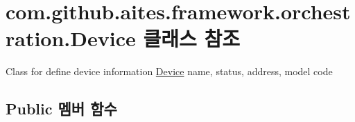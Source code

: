 \hypertarget{classcom_1_1github_1_1aites_1_1framework_1_1orchestration_1_1_device}{}\section{com.\+github.\+aites.\+framework.\+orchestration.\+Device 클래스 참조}
\label{classcom_1_1github_1_1aites_1_1framework_1_1orchestration_1_1_device}


Class for define device information \mbox{\hyperlink{classcom_1_1github_1_1aites_1_1framework_1_1orchestration_1_1_device}{Device}} name, status, address, model code  


\subsection*{Public 멤버 함수}

